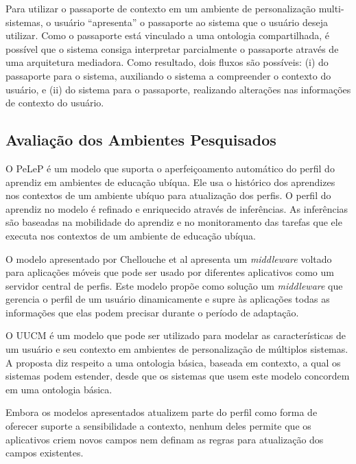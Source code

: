 Para utilizar o passaporte de contexto em um ambiente de personalização multi-sistemas, o usuário ``apresenta'' o passaporte ao sistema que o usuário deseja utilizar. Como o passaporte está vinculado a uma ontologia compartilhada, é possível que o sistema consiga interpretar parcialmente o passaporte através de uma arquitetura mediadora. Como resultado, dois fluxos são possíveis: (i) do passaporte para o sistema, auxiliando o sistema a compreender o contexto do usuário, e (ii) do sistema para o passaporte, realizando alterações nas informações de contexto do usuário.


\subsection{Avaliação dos Ambientes Pesquisados}

O PeLeP\cite{pelep} é um modelo que suporta o aperfeiçoamento automático do perfil do aprendiz em ambientes de educação ubíqua. Ele usa o histórico dos aprendizes nos contextos de um ambiente ubíquo para atualização dos perfis. O perfil do aprendiz no modelo é refinado e enriquecido através de inferências. As inferências são baseadas na mobilidade do aprendiz e no monitoramento das tarefas que ele executa nos contextos de um ambiente de educação ubíqua.

O modelo apresentado por Chellouche et al\cite{chellouche10} apresenta um \emph{middleware} voltado para aplicações móveis que pode ser usado por diferentes aplicativos como um servidor central de perfis. Este modelo propõe como solução um \emph{middleware} que gerencia o perfil de um usuário dinamicamente e supre às aplicações todas as informações que elas podem precisar durante o período de adaptação.

O UUCM\cite{niederee04} é um modelo que pode ser utilizado para modelar as características de um usuário e seu contexto em ambientes de personalização de múltiplos sistemas. A proposta diz respeito a uma ontologia básica, baseada em contexto, a qual os sistemas podem estender, desde que os sistemas que usem este modelo concordem em uma ontologia básica.

Embora os modelos apresentados atualizem parte do perfil como forma de oferecer suporte a sensibilidade a contexto, nenhum deles permite que os aplicativos criem novos campos nem definam as regras para atualização dos campos existentes.

